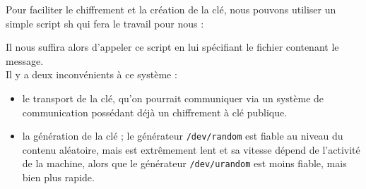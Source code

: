 Pour faciliter le chiffrement et la création de la clé, nous pouvons
utiliser un simple script sh qui fera le travail pour nous : 

\lstset{language=bash}


Il nous suffira alors d'appeler ce script en lui spécifiant le fichier
contenant le message.\\

Il y a deux inconvénients  à ce système : 
\begin{itemize}
  \item le transport de la clé,
qu'on pourrait communiquer via un système de communication possédant
déjà un chiffrement à clé publique.
  \item la
génération de la clé ; le générateur \texttt{/dev/random} est fiable
au niveau du contenu aléatoire, mais est extrêmement lent et sa
vitesse dépend de l'activité de la machine, alors que le
générateur \texttt{/dev/urandom} est moins fiable, mais bien plus
rapide.
\end{itemize}

